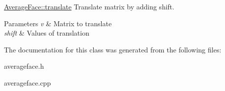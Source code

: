 \hyperlink{class_average_face_a3e9bfa47bfcac91123244f46d5465fa7}{Average\+Face\+::translate} Translate matrix by adding shift. 


\begin{DoxyParams}{Parameters}
{\em v} & Matrix to translate \\
\hline
{\em shift} & Values of translation \\
\hline
\end{DoxyParams}


The documentation for this class was generated from the following files\+:\begin{DoxyCompactItemize}
\item 
averageface.\+h\item 
averageface.\+cpp\end{DoxyCompactItemize}
